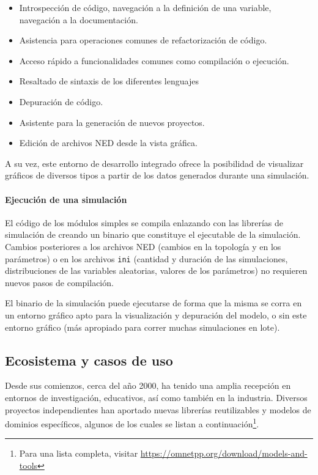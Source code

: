 \begin{itemize}
    \item Introspección de código, navegación a la definición de una variable,
navegación a la documentación.

    \item Asistencia para operaciones comunes de refactorización de código.

    \item Acceso rápido a funcionalidades comunes como compilación o ejecución.

    \item Resaltado de sintaxis de los diferentes lenguajes

    \item Depuración de código.

    \item Asistente para la generación de nuevos proyectos.

    \item Edición de archivos NED desde la vista gráfica.
\end{itemize}

A su vez, este entorno de desarrollo integrado ofrece la posibilidad de
visualizar gráficos de diversos tipos a partir de los datos generados durante
una simulación.

\paragraph{Ejecución de una simulación}

El código de los módulos simples se compila enlazando con las librerías de
simulación de \omnetpp{} creando un binario que constituye el ejecutable de la
simulación. Cambios posteriores a los archivos NED (cambios en la topología y
en los parámetros) o en los archivos \verb!ini! (cantidad y duración de las
simulaciones, distribuciones de las variables aleatorias, valores de los
parámetros) no requieren nuevos pasos de compilación.

El binario de la simulación puede ejecutarse de forma que la misma se
corra en un entorno gráfico apto para la visualización y depuración del modelo,
o sin este entorno gráfico (más apropiado para correr muchas simulaciones en
lote).

\subsection{Ecosistema y casos de uso}

Desde sus comienzos, cerca del año 2000, \omnetpp{} ha tenido una amplia
recepción en entornos de investigación, educativos, así como también en la
industria.  Diversos proyectos independientes han aportado nuevas librerías
reutilizables y modelos de dominios específicos, algunos de los cuales se
listan a continuación\footnote{Para una lista completa, visitar
\url{https://omnetpp.org/download/models-and-tools}}.


